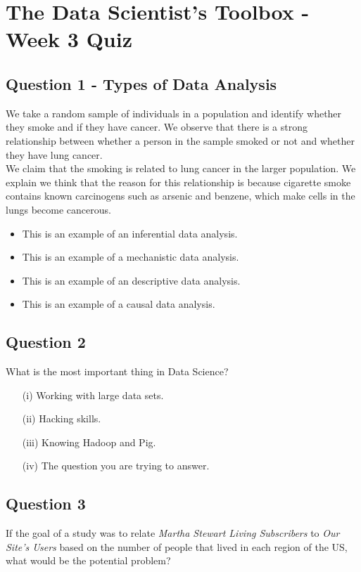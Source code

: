 \documentclass[12pt]{article}
\begin{document}
	
	\section*{The Data Scientist’s Toolbox - Week 3 Quiz}
	
	
	\subsection*{Question 1 - Types of Data Analysis}
We take a random sample of individuals in a population and identify whether they smoke and if they have cancer. We observe that there is a strong relationship between whether a person in the sample smoked or not and whether they have lung cancer. \\

\bigskip
\noindent We claim that the smoking is related to lung cancer in the larger population. We explain we think that the reason for this relationship is because cigarette smoke contains known carcinogens such as arsenic and benzene, which make cells in the lungs become cancerous.
\begin{itemize}
\item This is an example of an inferential data analysis.
\item This is an example of a mechanistic data analysis.
\item This is an example of an descriptive data analysis.
\item This is an example of a causal data analysis.
\end{itemize}
\newpage
\subsection*{Question 2}
What is the most important thing in Data Science?
\begin{itemize}
\item[(i)] Working with large data sets.
\item[(ii)] Hacking skills.
\item[(iii)] Knowing Hadoop and Pig.
\item[(iv)] The question you are trying to answer.
\end{itemize}
\newpage
\subsection*{Question 3}
If the goal of a study was to relate \textit{Martha Stewart Living Subscribers} to \textit{Our Site's Users} based on the number of people that lived in each region of the US, what would be the potential problem? 
\end{document}
